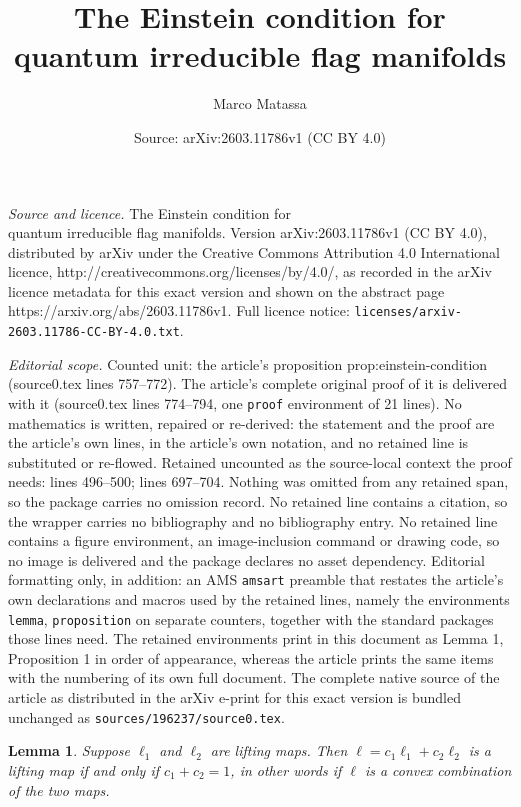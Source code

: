 \documentclass[10pt,a4paper]{amsart}
\title{The Einstein condition for \\ quantum irreducible flag manifolds}
\author{Marco Matassa}
\date{Source: arXiv:2603.11786v1 (CC BY 4.0)}
\newtheorem{lemma}{Lemma}
\newcommand{\liftmap}{\ell}
\begin{document}
\maketitle

\noindent\emph{Source and licence.} The Einstein condition for \\ quantum irreducible flag manifolds. Version arXiv:2603.11786v1 (CC BY 4.0), distributed by arXiv under the Creative Commons Attribution 4.0 International licence, http://creativecommons.org/licenses/by/4.0/, as recorded in the arXiv licence metadata for this exact version and shown on the abstract page https://arxiv.org/abs/2603.11786v1. Full licence notice: \texttt{licenses/arxiv-2603.11786-CC-BY-4.0.txt}.\par\smallskip

\noindent\textit{Editorial scope.} Counted unit: the article's proposition prop:einstein-condition (source0.tex lines 757--772). The article's complete original proof of it is delivered with it (source0.tex lines 774--794, one \texttt{proof} environment of 21 lines). No mathematics is written, repaired or re-derived: the statement and the proof are the article's own lines, in the article's own notation, and no retained line is substituted or re-flowed.  Retained uncounted as the source-local context the proof needs: lines 496--500; lines 697--704.  Nothing was omitted from any retained span, so the package carries no omission record.  No retained line contains a citation, so the wrapper carries no bibliography and no bibliography entry.  No retained line contains a figure environment, an image-inclusion command or drawing code, so no image is delivered and the package declares no asset dependency.  Editorial formatting only, in addition: an AMS \texttt{amsart} preamble that restates the article's own declarations and macros used by the retained lines, namely the environments \texttt{lemma}, \texttt{proposition} on separate counters, together with the standard packages those lines need.  The retained environments print in this document as Lemma 1, Proposition 1 in order of appearance, whereas the article prints the same items with the numbering of its own full document.  The complete native source of the article as distributed in the arXiv e-print for this exact version is bundled unchanged as \texttt{sources/196237/source0.tex}.
\begin{lemma}
\label{lem:convex-lifting}
Suppose $\liftmap_1$ and $\liftmap_2$ are lifting maps.
Then $\liftmap = c_1 \liftmap_1 + c_2 \liftmap_2$ is a lifting map if and only if $c_1 + c_2 = 1$, in other words if $\liftmap$ is a convex combination of the two maps.
\end{lemma}
\end{document}
